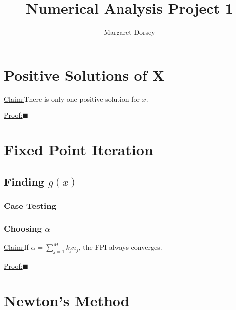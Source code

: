 \documentclass[11pt]{article} %
\title{Numerical Analysis Project 1}
\author{Margaret Dorsey}
\newenvironment{claim}[1]{\par\noindent\underline{Claim:}\space#1}{}
\newenvironment{proof}[1]{\par\noindent\underline{Proof:}\space#1}{\hfill $\blacksquare$}
\begin{document}
\maketitle

\section*{Positive Solutions of X}

\begin{claim}
There is only one positive solution for $x$.
\end{claim}
\begin{proof}


\end{proof}

\section*{Fixed Point Iteration}

\subsection*{Finding $g(x)$}

\subsubsection*{Case Testing}

\subsubsection*{Choosing $\alpha$}


\begin{claim}
If $\alpha  = \sum_{j=1}^M k_jn_j$, the FPI always converges.
\end{claim}
\begin{proof}
\end{proof}


\section*{Newton's Method}
\end{document}
